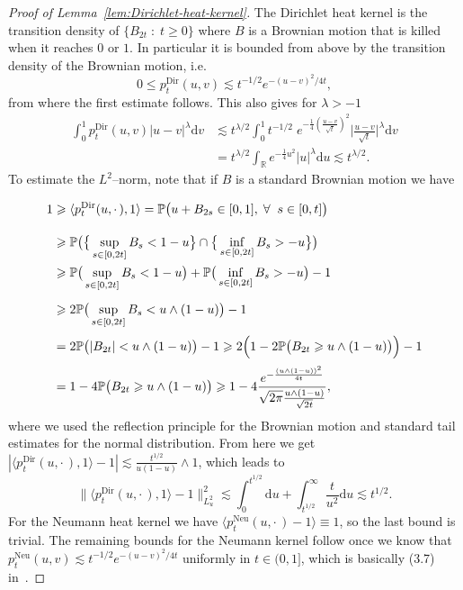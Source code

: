 \documentclass[10pt]{amsart}
\theoremstyle{definition}\newtheorem{defi}[theo]{Definition}\newtheorem{rema}[theo]{Remark}\newtheorem{exam}[theo]{Example}\newtheorem{exem}[theo]{Example}\newtheorem{nota}[theo]{Notation}
\DeclareMathOperator{\Dir}{Dir}
\DeclareMathOperator{\Neu}{Neu}
\renewcommand{\leq}{\leqslant}
\renewcommand{\geq}{\geqslant}
\newcommand*{\dd}{\mathrm{d}}
\newcommand*{\du}{\dd u}
\newcommand*{\dv}{\dd v}
\let\oldforall\forall
\renewcommand*{\forall}{\mathrel{\oldforall}}
\begin{document}
\begin{proof}[Proof of Lemma~\ref{lem:Dirichlet-heat-kernel}]
The Dirichlet heat kernel is the transition density of $\{B_{2 t} \; : \; t
\geq 0\}$ where $B$ is a Brownian motion that is killed when it reaches $0$ or $1$. In particular it is bounded from above by the transition density of the Brownian motion, i.e.
\[
0 \leq p^{\Dir}_t (u, v) \lesssim t^{- 1 / 2} e^{- (u - v)^2 / 4 t},
\]
from where the first estimate follows. This also gives for $\lambda > - 1$
\begin{align*}
\int_0^1 p^{\Dir}_t (u, v) | u - v |^{\lambda} \dv &\lesssim t^{\lambda /2} \int_0^1 t^{- 1 / 2} \; e^{- \frac{1}{4} \left(\frac{u - v}{\sqrt{t}}\right)^2} \bigg| \frac{u - v}{\sqrt{t}} \bigg|^{\lambda} \dv
\\& = t^{\lambda / 2} \int_{\mathbb{R}} e^{- \frac{1}{4} u^2} | u |^{\lambda} \du \lesssim t^{\lambda / 2}.
\end{align*}
To estimate the $L^2$--norm, note that if $B$ is a standard Brownian motion we have
\begingroup
\allowdisplaybreaks
\begin{align*}
1 & \geq \langle p_t^{\Dir} (u, \cdot\,), 1 \rangle =\mathbb{P} \big(u + B_{2 s} \in [0, 1], \; \forall \; s \in [0, t]\big) \vphantom{\int} \\
& \geq \mathbb{P} \big(\big\{ \sup_{s \in [0, 2 t]} B_s < 1 - u \big\} \cap \big\{ \inf_{s \in [0, 2t]} B_s > - u \big\}\big)\vphantom{\int}\\
& \geq \mathbb{P} \big(\sup_{s \in [0, 2 t]} B_s < 1 - u\big) +\mathbb{P}
\big(\inf_{s \in [0, 2t]} B_s > - u\big) - 1 \\
& \vphantom{\int} \geq 2\mathbb{P}\big(\sup_{s \in [0, 2 t]} B_s < u \wedge (1 - u)\big) - 1\vphantom{\int}\\
& = 2\mathbb{P} \big(| B_{2 t} | < u \wedge (1 - u)\big) - 1 \geq 2 \Big(1 - 2\mathbb{P} \big(B_{2 t} \geq u \wedge (1 - u)\big)\Big) - 1\vphantom{\int}\\*
& = 1 - 4\mathbb{P} \big(B_{2 t} \geq u \wedge (1 - u)\big) \geq 1 - 4
\frac{e^{- \frac{(u \wedge (1 - u))^2}{4 t}}}{\sqrt{2 \pi} \frac{u \wedge (1 - u)}{\sqrt{2 t}}},
\end{align*}
\endgroup
where we used the reflection principle for the Brownian motion and standard tail estimates for the normal distribution. From here we get $| \langle p_t^{\Dir} (u, \cdot\,), 1 \rangle - 1 | \lesssim \frac{t^{1 / 2}}{u (1 - u)}
\wedge 1$, which leads to
\[
\big\| \langle p_t^{\Dir} (u, \cdot\,), 1 \rangle - 1 \big\|_{L^2_u}^2 \lesssim
\int_0^{t^{1 / 2}} \du + \int_{t^{1 / 2}}^{\infty} \frac{t}{u^2} \du \lesssim t^{1 / 2}.
\]
For the Neumann heat kernel we have $\langle p^{\Neu}_t(u, \cdot\,) -1\rangle \equiv 1$, so the last bound is trivial. The remaining bounds for the Neumann kernel follow once we know that $p^{\Neu}_t (u, v) \lesssim t^{- 1 / 2} e^{- (u - v)^2 / 4 t}$ uniformly in $t \in (0,1]$, which is basically (3.7) in~\cite{Walsh1986}.
\end{proof}
\end{document}
